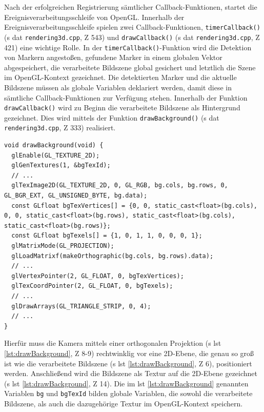 \noindent Nach der erfolgreichen Registrierung sämtlicher Callback-Funktionen, startet die Ereignisverarbeitungsschleife von OpenGL. Innerhalb der Ereignisverarbeitungsschleife spielen zwei Callback-Funktionen, \texttt{timerCallback()} (\acs{s} \acs{dat} \texttt{rendering3d.cpp}, \acs{Z} 543) und \texttt{drawCallback()} (\acs{s} \acs{dat} \texttt{rendering3d.cpp}, \acs{Z} 421) eine wichtige Rolle. In der \texttt{timerCallback()}-Funktion wird die Detektion von Markern angestoßen, gefundene Marker in einem globalen Vektor abgespeichert, die verarbeitete Bildszene global gesichert und letztlich die Szene im OpenGL-Kontext gezeichnet. Die detektierten Marker und die aktuelle Bildszene müssen als globale Variablen deklariert werden, damit diese in sämtliche Callback-Funktionen zur Verfügung stehen. Innerhalb der Funktion \texttt{drawCallback()} wird zu Beginn die verarbeitete Bildszene als Hintergrund gezeichnet. Dies wird mittels der Funktion \texttt{drawBackground()} (\acs{s} \acs{dat} \texttt{rendering3d.cpp}, \acs{Z} 333) realisiert.

\begin{lstlisting}[caption={Die Funktion \texttt{rendering3d.cpp/drawBackground();} zeichnet den Inhalt des aktuell verarbeiteten Bilds auf eine 2D-Ebene, die orthogonal zu Kamera steht}, label={lst:drawBackground}]
void drawBackground(void) {
  glEnable(GL_TEXTURE_2D);
  glGenTextures(1, &bgTexId);
  // ...
  glTexImage2D(GL_TEXTURE_2D, 0, GL_RGB, bg.cols, bg.rows, 0, GL_BGR_EXT, GL_UNSIGNED_BYTE, bg.data);
  const GLfloat bgTexVertices[] = {0, 0, static_cast<float>(bg.cols), 0, 0, static_cast<float>(bg.rows), static_cast<float>(bg.cols), static_cast<float>(bg.rows)};
  const GLfloat bgTexels[] = {1, 0, 1, 1, 0, 0, 0, 1};
  glMatrixMode(GL_PROJECTION);
  glLoadMatrixf(makeOrthographic(bg.cols, bg.rows).data);
  // ...
  glVertexPointer(2, GL_FLOAT, 0, bgTexVertices);
  glTexCoordPointer(2, GL_FLOAT, 0, bgTexels);
  // ...
  glDrawArrays(GL_TRIANGLE_STRIP, 0, 4);
  // ...
}
\end{lstlisting}

\noindent Hierfür muss die Kamera mittels einer orthogonalen Projektion (\acs{s} \acs{lst} \ref{lst:drawBackground}, \acs{Z} 8-9) rechtwinklig vor eine 2D-Ebene, die genau so groß ist wie die verarbeitete Bildszene (\acs{s} \acs{lst} \ref{lst:drawBackground}, \acs{Z} 6), positioniert werden. Anschließend wird die Bildszene als Textur auf die 2D-Ebene gezeichnet (\acs{s} \acs{lst} \ref{lst:drawBackground}, \acs{Z} 14). Die im \acs{lst} \ref{lst:drawBackground} genannten Variablen \texttt{bg} und \texttt{bgTexId} bilden globale Variablen, die sowohl die verarbeitete Bildszene, als auch die dazugehörige Textur im OpenGL-Kontext speichern.

